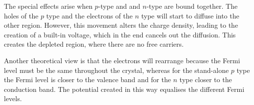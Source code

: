 \par
The special effects arise when $p$-type and and $n$-type are bound together. The holes of the $p$ type and the electrons of the $n$ type will start to diffuse into the other region. However, this movement alters the charge density, leading to the creation of a built-in voltage, which in the end cancels out the diffusion. This creates the depleted region, where there are no free carriers. 
\par
Another theoretical view is that the electrons will rearrange because the Fermi level must be the same throughout the crystal, whereas for the stand-alone $p$ type the Fermi level is closer to the valence band and for the $n$ type closer to the conduction band. The potential created in this way equalises the different Fermi levels.
%

